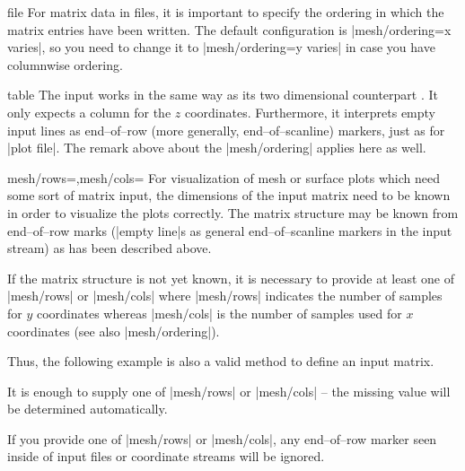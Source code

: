 {\begin{addplot3operation}[]{file}{}
	For matrix data in files, it is important to specify the ordering in which the matrix entries have been written. The default configuration is |mesh/ordering=x varies|, so you need to change it to |mesh/ordering=y varies| in case you have columnwise ordering.
\end{addplot3operation}

\begin{addplot3operation}[]{table}{}
	The  input works in the same way as its two dimensional counterpart . It only expects a column for the $z$ coordinates. Furthermore, it interprets empty input lines as end--of--row (more generally, end--of--scanline) markers, just as for |plot file|. The remark above about the |mesh/ordering| applies here as well.
\end{addplot3operation}

\begin{pgfplotskeylist}{mesh/rows=,mesh/cols=}
	For visualization of mesh or surface plots which need some sort of matrix input, the dimensions of the input matrix need to be known in order to visualize the plots correctly. The matrix structure may be known from end--of--row marks (|empty line|s as general end--of--scanline markers in the input stream) as has been described above.

	If the matrix structure is not yet known, it is necessary to provide at least one of |mesh/rows| or |mesh/cols| where |mesh/rows| indicates the number of samples for $y$ coordinates whereas |mesh/cols| is the number of samples used for $x$ coordinates (see also |mesh/ordering|). 

	Thus, the following example is also a valid method to define an input matrix.
\begin{codeexample}[]
\end{codeexample}

	It is enough to supply one of |mesh/rows| or |mesh/cols| -- the missing value will be determined automatically.
	
	If you provide one of |mesh/rows| or |mesh/cols|, any end--of--row marker seen inside of input files or coordinate streams will be ignored.


\end{pgfplotskeylist}}
